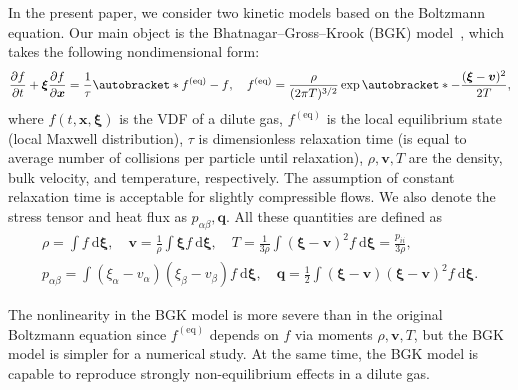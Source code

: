 \documentclass{aip-cp}
\newcommand{\dd}{\mathrm{d}}
\newcommand{\pder}[2][]{\frac{\partial#1}{\partial#2}}
\DeclarePairedDelimiter\autobracket()       %
\newcommand{\br}[1]{\autobracket*{#1}}
\newcommand{\dxi}{\:\boldsymbol{\dd\xi}}
\newcommand{\bxi}{\boldsymbol{\xi}}
\newcommand{\bv}{\boldsymbol{v}}
\newcommand{\bq}{\boldsymbol{q}}
\newcommand{\bx}{\boldsymbol{x}}
\newcommand{\equil}[1]{#1^\mathrm{(eq)}}
\begin{document}
In the present paper, we consider two kinetic models based on the Boltzmann equation.
Our main object is the Bhatnagar--Gross--Krook (BGK) model~\cite{Krook1954},
which takes the following nondimensional form:
\begin{equation}\label{eq:bgk}
    \pder[f]{t} + \bxi\pder[f]{\bx} = \frac1\tau\br{ \equil{f}-f }, \quad
    \equil{f} = \frac{\rho}{(2\pi T)^{3/2}}\exp\br{ -\frac{(\bxi-\bv)^2}{2T} },
\end{equation}
where $f(t,\bx,\bxi)$ is the VDF of a dilute gas, $\equil{f}$ is the local equilibrium state (local Maxwell distribution),
$\tau$ is dimensionless relaxation time (is equal to average number of collisions per particle until relaxation),
$\rho,\bv,T$ are the density, bulk velocity, and temperature, respectively.
The assumption of constant relaxation time is acceptable for slightly compressible flows.
We also denote the stress tensor and heat flux as $p_{\alpha \beta}, \bq$.
All these quantities are defined as
\begin{equation}\label{eq:macro}
    \begin{gathered}
    \rho = \int f \dxi, \quad
    \bv = \frac1{\rho} \int \bxi f \dxi, \quad
    T = \frac{1}{3\rho}\int(\bxi-\bv)^2f \dxi = \frac{p_{ii}}{3\rho}, \\
    p_{\alpha \beta} = \int(\xi_{\alpha}-v_{\alpha})(\xi_{\beta}-v_{\beta}) f \dxi, \quad
    \bq = \frac{1}{2}\int(\bxi-\bv)(\bxi-\bv)^2 f \dxi.
    \end{gathered}
\end{equation}

The nonlinearity in the BGK model is more severe than in the original Boltzmann equation since $\equil{f}$ depends on $f$
via moments $\rho,\bv,T$, but the BGK model is simpler for a numerical study.
At the same time, the BGK model is capable to reproduce strongly non-equilibrium effects in a dilute gas.
\end{document}

